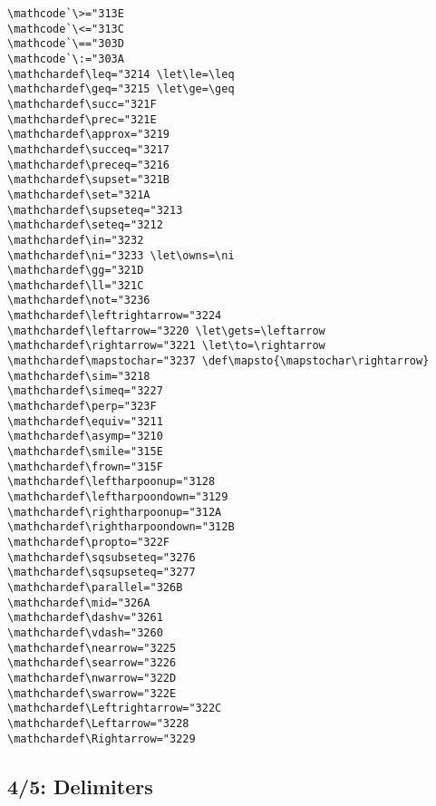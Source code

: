 {{{{{{%



%

\begin{verbatim}
\mathcode`\>="313E
\mathcode`\<="313C
\mathcode`\=="303D
\mathcode`\:="303A
\mathchardef\leq="3214 \let\le=\leq
\mathchardef\geq="3215 \let\ge=\geq
\mathchardef\succ="321F
\mathchardef\prec="321E
\mathchardef\approx="3219
\mathchardef\succeq="3217
\mathchardef\preceq="3216
\mathchardef\supset="321B
\mathchardef\set="321A
\mathchardef\supseteq="3213
\mathchardef\seteq="3212
\mathchardef\in="3232
\mathchardef\ni="3233 \let\owns=\ni
\mathchardef\gg="321D
\mathchardef\ll="321C
\mathchardef\not="3236
\mathchardef\leftrightarrow="3224
\mathchardef\leftarrow="3220 \let\gets=\leftarrow
\mathchardef\rightarrow="3221 \let\to=\rightarrow
\mathchardef\mapstochar="3237 \def\mapsto{\mapstochar\rightarrow}
\mathchardef\sim="3218
\mathchardef\simeq="3227
\mathchardef\perp="323F
\mathchardef\equiv="3211
\mathchardef\asymp="3210
\mathchardef\smile="315E
\mathchardef\frown="315F
\mathchardef\leftharpoonup="3128
\mathchardef\leftharpoondown="3129
\mathchardef\rightharpoonup="312A
\mathchardef\rightharpoondown="312B
\mathchardef\propto="322F
\mathchardef\sqsubseteq="3276
\mathchardef\sqsupseteq="3277
\mathchardef\parallel="326B
\mathchardef\mid="326A
\mathchardef\dashv="3261
\mathchardef\vdash="3260
\mathchardef\nearrow="3225
\mathchardef\searrow="3226
\mathchardef\nwarrow="322D
\mathchardef\swarrow="322E
\mathchardef\Leftrightarrow="322C
\mathchardef\Leftarrow="3228
\mathchardef\Rightarrow="3229
\end{verbatim}


\subsection{4/5: Delimiters}

}}}}}}
